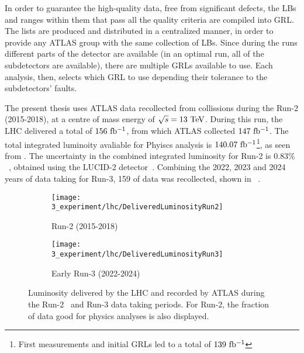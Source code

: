 In order to guarantee the high-quality data, free from significant defects, the \acp{LB} and ranges within them that pass all the quality criteria are compiled into \ac{GRL}. The lists are produced and distributed in a centralized manner, in order to provide any \ac{ATLAS} group with the same collection of \acp{LB}. Since during the runs different parts of the detector are available (in an optimal run, all of the subdetectors are available), there are multiple \acp{GRL} available to use. Each analysis, then, selects which \ac{GRL} to use depending their tolerance to the subdetectors' faults.

The present thesis uses \ac{ATLAS} data recollected from \pp collissions during the Run-2 (2015-2018), at a centre of mass energy of \(\sqrt{s} = 13~\tev\). During this run, the \ac{LHC} delivered a total of \(156~\ifb\), from which \ac{ATLAS} collected \(147~\ifb\). The total integrated luminoity avaliable for Phyiscs analysis is \(140.07~\ifb\)\footnote{First measurements and initial \acp{GRL} led to a total of \(139~\ifb\)}, as seen from \Fig{\ref{fig:atlas:runs:lumi_run2}}. The uncertainty in the combined integrated luminosity for Run-2 is \(0.83\%\)~\cite{ATLASLumiRun2}, obtained using the LUCID-2 detector~\cite{LUCID2}.
Combining the 2022, 2023 and 2024 years of data taking for Run-3, 159 \ifb of data was recollected, shown in \Fig{\ref{fig:atlas:runs:lumi_run3}}~\cite{ATLASLumiRun3-2022,ATLASLumiRun3-2023}.

\begin{figure}[ht!]
    \centering
    \begin{subfigure}[h]{0.49\linewidth}
        \centering
        \texttt{[image: 3\_experiment/lhc/DeliveredLuminosityRun2]}
        \caption{Run-2 (2015-2018)}
        \label{fig:atlas:runs:lumi_run2}
    \end{subfigure}
    \hfill
    \begin{subfigure}[h]{0.49\linewidth}
        \centering
        \texttt{[image: 3\_experiment/lhc/DeliveredLuminosityRun3]}
        \caption{Early Run-3 (2022-2024)}
        \label{fig:atlas:runs:lumi_run3}
    \end{subfigure}
    \caption{Luminosity delivered by the \ac{LHC} and recorded by \ac{ATLAS} during the Run-2~\cite{ATLASLumiRun2} and Run-3 data taking periods. For Run-2, the fraction of data good for physics analyses is also displayed.}
    \label{fig:atlas:runs:lumi}
\end{figure}

